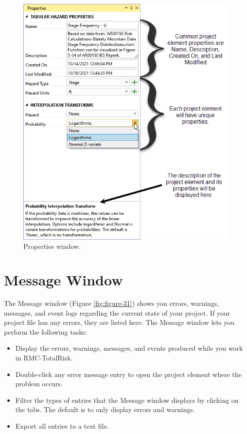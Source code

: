 \documentclass[
]{book}
\begin{document}
\begin{figure}

{\centering \includegraphics{images/figure30} 

}

\caption{Properties window.}\label{fig:figure-30}
\end{figure}

\hypertarget{message-window}{%
\section{Message Window}\label{message-window}}

The Message window (Figure \ref{fig:figure-31}) shows you errors, warnings, messages, and event logs regarding the current state of your project. If your project file has any errors, they are listed here. The Message window lets you perform the following tasks:

\begin{itemize}
\item
  Display the errors, warnings, messages, and events produced while you work in RMC-TotalRisk.
\item
  Double-click any error message entry to open the project element where the problem occurs.
\item
  Filter the types of entries that the Message window displays by clicking on the tabs. The default is to only display errors and warnings.
\item
  Export all entries to a text file.
\end{itemize}
\end{document}
